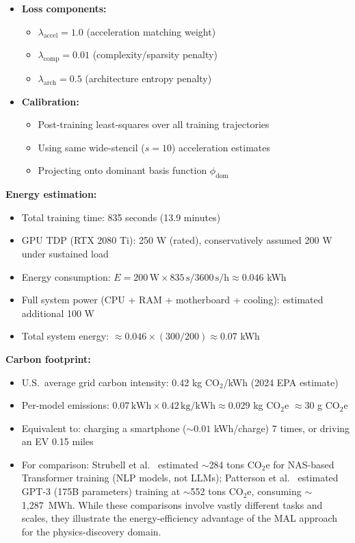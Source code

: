 \documentclass[aps,pre,reprint,superscriptaddress]{revtex4-2}
\begin{document}
\begin{itemize}
\item \textbf{Loss components:}
  \begin{itemize}
  \item $\lambda_{\text{accel}} = 1.0$ (acceleration matching weight)
  \item $\lambda_{\text{comp}} = 0.01$ (complexity/sparsity penalty)
  \item $\lambda_{\text{arch}} = 0.5$ (architecture entropy penalty)
  \end{itemize}

\item \textbf{Calibration:}
  \begin{itemize}
  \item Post-training least-squares over all training trajectories
  \item Using same wide-stencil ($s=10$) acceleration estimates
  \item Projecting onto dominant basis function $\phi_{\text{dom}}$
  \end{itemize}
\end{itemize}

\textbf{Energy estimation:}
\begin{itemize}
\item Total training time: 835 seconds (13.9 minutes)
\item GPU TDP (RTX 2080 Ti): 250 W (rated), conservatively assumed 200 W under sustained load
\item Energy consumption: $E = 200\,\text{W} \times 835\,\text{s} / 3600\,\text{s/h} \approx 0.046$ kWh
\item Full system power (CPU + RAM + motherboard + cooling): estimated additional 100 W
\item Total system energy: $\approx 0.046 \times (300/200) \approx 0.07$ kWh
\end{itemize}

\textbf{Carbon footprint:}
\begin{itemize}
\item U.S.\ average grid carbon intensity: 0.42 kg CO$_2$/kWh (2024 EPA estimate)
\item Per-model emissions: $0.07\,\text{kWh} \times 0.42\,\text{kg/kWh} \approx 0.029$ kg CO$_2$e $\approx 30$ g CO$_2$e
\item Equivalent to: charging a smartphone ($\sim 0.01$ kWh/charge) 7 times, or driving an EV 0.15 miles
\item For comparison: Strubell et al.\ \cite{Strubell2019} estimated $\sim$284 tons CO$_2$e for NAS-based Transformer training (NLP models, not LLMs); Patterson et al.\ \cite{Patterson2021} estimated GPT-3 (175B parameters) training at $\sim$552 tons CO$_2$e, consuming $\sim$1{,}287~MWh. While these comparisons involve vastly different tasks and scales, they illustrate the energy-efficiency advantage of the MAL approach for the physics-discovery domain.
\end{itemize}
\end{document}
